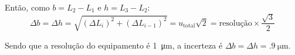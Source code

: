 Então, como $b = L_2 - L_1$ e $h = L_3 - L_2$:
\begin{equation*}
    \Delta b = \Delta h = \sqrt{(\Delta L_i)^2 + (\Delta L_{i-1})^2} = u_\text{total} \sqrt{2} = \text{resolução} \times \frac{\sqrt{3}}{2}
\end{equation*}

Sendo que a resolução do equipamento é \SI{1}{\micro\meter}, a incerteza é $\Delta b = \Delta h = \SI{.9}{\micro\meter}$.

